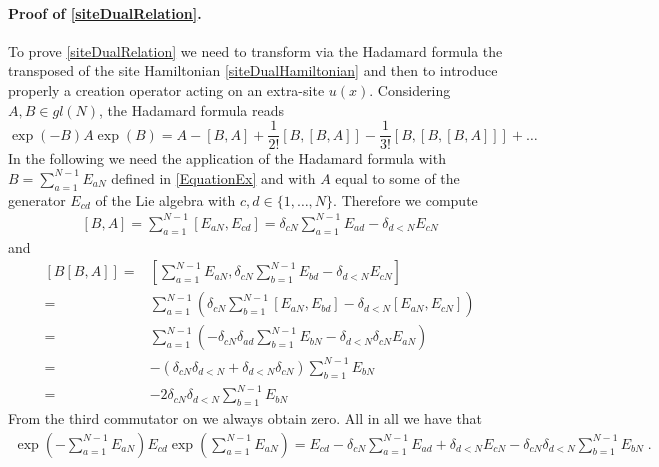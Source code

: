\documentclass[10pt]{article}
\numberwithin{equation}{section}
\numberwithin{equation}{subsection}
\newcommand{\dt}{\;.}
\begin{document}
 \paragraph{Proof of \eqref{siteDualRelation}.} To prove \eqref{siteDualRelation} we need to transform via the Hadamard formula the transposed of the site Hamiltonian \eqref{siteDualHamiltonian} and then to  introduce properly a creation operator acting on an extra-site $u(x)$. %
 Considering $A,B\in gl(N)$, the Hadamard formula reads 
 \begin{equation}\label{HadamardFormula}
     \exp{(-B)}A\exp{(B)}=A-\left[B,A\right]+\frac{1}{2!}\left[B,\left[B,A\right]\right]-\frac{1}{3!}\left[B,\left[B,\left[B,A\right]\right]\right]+\ldots
 \end{equation}
In the following we need the application of the Hadamard formula with $B=\sum_{a=1}^{N-1}E_{aN}$ defined in \eqref{EquationEx} and with $A$ equal to some of the generator $E_{cd}$ of the Lie algebra with $c,d\in\{1,\ldots,N\}$. Therefore we compute 
\begin{align}
	\left[B,A\right]=\sum_{a=1}^{N-1}\left[E_{aN},E_{cd}\right]=\delta_{cN}\sum_{a=1}^{N-1}E_{ad}-\delta_{d<N}E_{cN}
\end{align}
and 
\begin{align}
	\left[B\left[B,A\right]\right]=&\left[\sum_{a=1}^{N-1}E_{aN},\delta_{cN}\sum_{b=1}^{N-1}E_{bd}-\delta_{d<N}E_{cN}\right]\nonumber\\=&
	\sum_{a=1}^{N-1}\left(\delta_{cN}\sum_{b=1}^{N-1}\left[E_{aN},E_{bd}\right]-\delta_{d<N}\left[E_{aN},E_{cN}\right]\right)\nonumber\\=&
	\sum_{a=1}^{N-1}\left(-\delta_{cN}\delta_{ad}\sum_{b=1}^{N-1}E_{bN}-\delta_{d<N}\delta_{cN}E_{aN}\right)\nonumber\\=&
	-\left(\delta_{cN}\delta_{d<N}+\delta_{d<N}\delta_{cN}\right)\sum_{b=1}^{N-1}E_{bN}\nonumber
	\\=&
	-2\delta_{cN}\delta_{d<N}\sum_{b=1}^{N-1}E_{bN}
\end{align}
From the third commutator on we always obtain zero. All in all we have that 
 \begin{align}\label{HT-BA}
 	\exp{\left(-\sum_{a=1}^{N-1}E_{aN}\right)}E_{cd}\exp{\left(\sum_{a=1}^{N-1}E_{aN}\right)}=E_{cd}-\delta_{cN}\sum_{a=1}^{N-1}E_{ad}+\delta_{d<N}E_{cN}-\delta_{cN}\delta_{d<N}\sum_{b=1}^{N-1}E_{bN}\dt
 \end{align}
\end{document}
